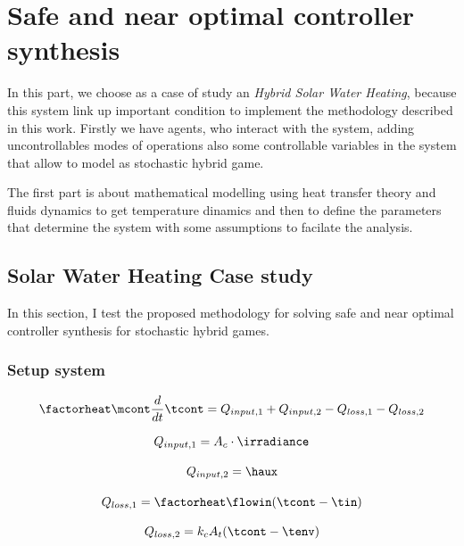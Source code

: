 
\chapter{Safe and near optimal controller synthesis}

\label{ch:proposal}
In this part, we choose as a case of study an \emph{Hybrid Solar Water
Heating}, because this system link up important condition to implement the
methodology described in this work. Firstly we have agents, who interact with 
the system, adding uncontrollables modes of operations also some controllable
variables in the system that allow to model as stochastic hybrid game.

The first part is about mathematical modelling using heat transfer
theory and fluids dynamics to get temperature dinamics and then 
to define the parameters that determine the system with some
assumptions to facilate the analysis.

\section{Solar Water Heating Case study}
In this section, I test the proposed methodology for solving safe and near optimal controller synthesis 
for stochastic hybrid games.

\subsection{Setup system}



\begin{equation}
    \factorheat\mcont\frac{d}{dt}\tcont =  Q_{input,1} + Q_{input,2} - Q_{loss,1} -  Q_{loss,2}
\end{equation}

\begin{equation}
    Q_{input,1} =   A_c\cdot\irradiance
\end{equation}

\begin{equation}
    Q_{input,2} =   \haux
\end{equation}

\begin{equation}
    Q_{loss,1} =  \factorheat \flowin (\tcont-\tin)
\end{equation}

\begin{equation}
    Q_{loss,2} =  k_c A_t (\tcont-\tenv)
\end{equation}


